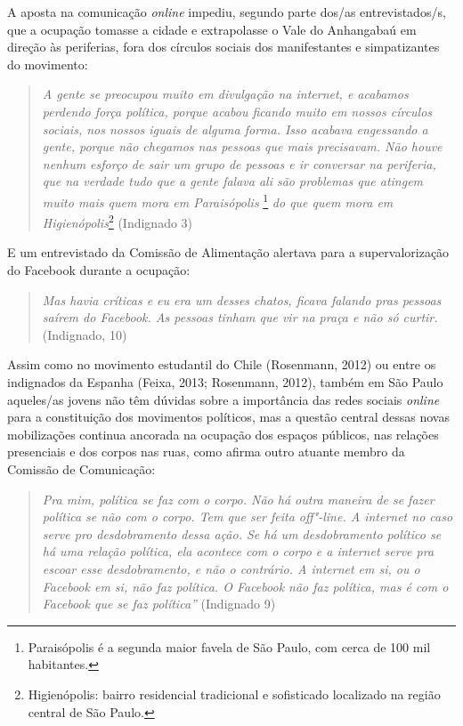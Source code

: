 A aposta na comunicação \emph{online} impediu, segundo parte dos/as
entrevistados/s, que a ocupação tomasse a cidade e extrapolasse o Vale
do Anhangabaú em direção às periferias, fora dos círculos sociais dos
manifestantes e simpatizantes do movimento:

\begin{quote}
\emph{A gente se preocupou muito em divulgação na internet, e acabamos
perdendo força política, porque acabou ficando muito em nossos círculos
sociais, nos nossos iguais de alguma forma. Isso acabava engessando a
gente, porque não chegamos nas pessoas que mais precisavam. Não houve
nenhum esforço de sair um grupo de pessoas e ir conversar na periferia,
que na verdade tudo que a gente falava ali são problemas que atingem
muito mais quem mora em Paraisópolis} \footnote{Paraisópolis é a segunda
  maior favela de São Paulo, com cerca de 100 mil habitantes.} \emph{do
que quem mora em Higienópolis}\footnote{Higienópolis: bairro residencial
  tradicional e sofisticado localizado na região central de São Paulo.}
(Indignado 3)
\end{quote}

E um entrevistado da Comissão de Alimentação alertava para a
supervalorização do Facebook durante a ocupação:

\begin{quote}
\emph{Mas havia críticas e eu era um desses chatos, ficava falando pras
pessoas saírem do Facebook. As pessoas tinham que vir na praça e não só
curtir.} (Indignado, 10)
\end{quote}

Assim como no movimento estudantil do Chile (Rosenmann, 2012) ou entre
os indignados da Espanha (Feixa, 2013; Rosenmann, 2012), também em São
Paulo aqueles/as jovens não têm dúvidas sobre a importância das redes
sociais \emph{online} para a constituição dos movimentos políticos, mas
a questão central dessas novas mobilizações continua ancorada na
ocupação dos espaços públicos, nas relações presenciais e dos corpos nas
ruas, como afirma outro atuante membro da Comissão de Comunicação:

\begin{quote}
\emph{Pra mim, política se faz com o corpo. Não há outra maneira de se
fazer política se não com o corpo. Tem que ser feita off"-line. A
internet no caso serve pro desdobramento dessa ação. Se há um
desdobramento político se há uma relação política, ela acontece com o
corpo e a internet serve pra escoar esse desdobramento, e não o
contrário. A internet em si, ou o Facebook em si, não faz política. O
Facebook não faz política, mas é com o Facebook que se faz política''}
(Indignado 9)
\end{quote}


